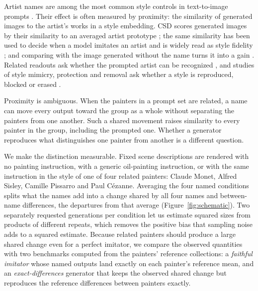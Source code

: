 \documentclass[10pt]{article}
\begin{document}
Artist names are among the most common style controls in text-to-image prompts
\citep{wang2023diffusiondb}. Their effect is often measured by proximity: the similarity of
generated images to the artist's works in a style embedding. CSD scores generated images by their
similarity to an averaged artist prototype \citep{somepalli2024style}; the same similarity has been
used to decide when a model imitates an artist \citep{verma2025imitation} and is widely read as
style fidelity \citep{frochte2026csd}; and comparing with the image generated without the name
turns it into a gain \citep{su2025prompted}. Related readouts ask whether the prompted artist can
be recognized \citep{casper2023measuring,su2025prompted,moayeri2025rethinking}, and studies of style
mimicry, protection and removal ask whether a style is reproduced, blocked or erased
\citep{shan2023glaze,honig2025adversarial,gandikota2023erasing,kumari2023ablating,zhang2024unlearncanvas}.

Proximity is ambiguous. When the painters in a prompt set are related, a name can move every
output toward the group as a whole without separating the painters from one another. Such a shared
movement raises similarity to every painter in the group, including the prompted one. Whether a
generator reproduces what distinguishes one painter from another is a different question.

We make the distinction measurable. Fixed scene descriptions are rendered with no painting
instruction, with a generic oil-painting instruction, or with the same instruction in the style
of one of four related painters: Claude Monet, Alfred Sisley, Camille Pissarro and Paul
C\'ezanne. Averaging the four named conditions splits what the names add into a change shared
by all four names and between-name differences, the departures from that average
(Figure~\ref{fig:schematic}). Two separately requested generations per condition let us
estimate squared sizes from products of different repeats, which removes the positive bias that
sampling noise adds to a squared estimate. Because related painters should produce a large
shared change even for a perfect imitator, we compare the observed quantities with two
benchmarks computed from the painters' reference collections: a \emph{faithful imitator} whose
named outputs land exactly on each painter's reference mean, and an \emph{exact-differences}
generator that keeps the observed shared change but reproduces the reference differences
between painters exactly.
\end{document}
